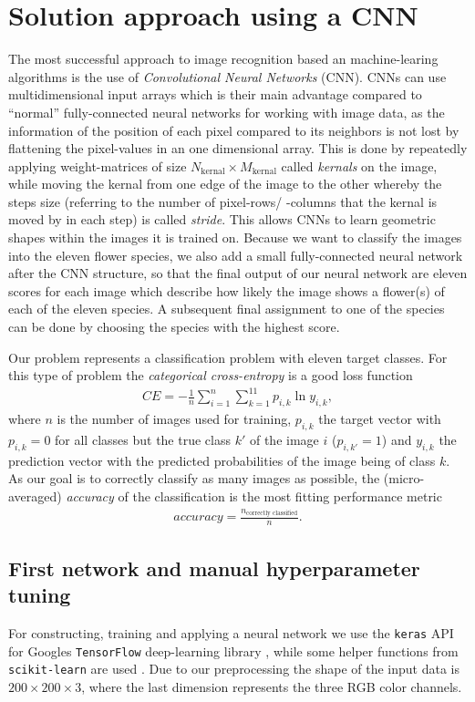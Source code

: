 \section{Solution approach using a CNN}
\label{sec:ansatz}
The most successful approach to image recognition based an machine-learing algorithms is the use of \textit{Convolutional Neural Networks} (CNN).
CNNs can use multidimensional input arrays which is their main advantage compared to \enquote{normal} fully-connected neural networks for working with image data, 
as the information of the position of each pixel compared to its neighbors is not lost by flattening the pixel-values in an one dimensional array.
This is done by repeatedly applying weight-matrices of size $N_\text{kernal}\times M_\text{kernal}$ called \textit{kernals} on the image, while moving the kernal from one edge of the image to the other 
whereby the steps size (referring to the number of pixel-rows/ -columns that the kernal is moved by in each step) is called \textit{stride}.
This allows CNNs to learn geometric shapes within the images it is trained on.
Because we want to classify the images into the eleven flower species, we also add a small fully-connected neural network after the CNN structure, so that the final output of our
neural network are eleven scores for each image which describe how likely the image shows a flower(s) of each of the eleven species.
A subsequent final assignment to one of the species can be done by choosing the species with the highest score.

Our problem represents a classification problem with eleven target classes.
For this type of problem the \textit{categorical cross-entropy} is a good loss function
\begin{align}
    CE = -\frac{1}{n} \sum_{i=1}^n \sum_{k=1}^{11} p_{i,k} \ln{y_{i,k}},
\end{align}
where $n$ is the number of images used for training, $p_{i,k}$ the target vector with $p_{i,k} = 0$ for all classes but the true class $k'$ of the image $i$ ($p_{i,k'} = 1$) and 
$y_{i,k}$ the prediction vector with the predicted probabilities of the image being of class $k$.
As our goal is to correctly classify as many images as possible, the (micro-averaged) \textit{accuracy} of the classification is the most fitting performance metric
\begin{align}
    accuracy = \frac{n_\text{correctly classified}}{n}.
\end{align}


\subsection{First network and manual hyperparameter tuning}
For constructing, training and applying a neural network we use the \texttt{keras} API for Googles \texttt{TensorFlow} deep-learning library \cite{keras}, 
while some helper functions from \texttt{scikit-learn} are used \cite{scikit-learn}.
Due to our preprocessing the shape of the input data is $200\times 200\times 3$, where the last dimension represents the three RGB color channels.

